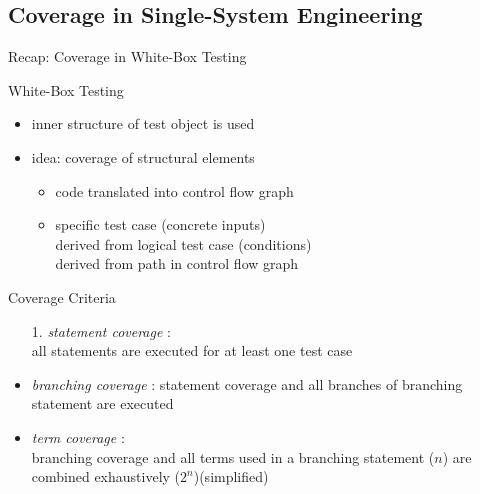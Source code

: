 \subsection{Coverage in Single-System Engineering}
\begin{frame}{Recap: Coverage in White-Box Testing{}  \mytitlesource{\ludewiglichter}}
	\begin{fancycolumns}
		\begin{definition}{White-Box Testing }
			\begin{itemize}
				\item inner structure of test object is used
				\item idea: coverage of structural elements
				\begin{itemize}
					\item code translated into control flow graph
					\item specific test case (concrete inputs)\\derived from logical test case (conditions)\\derived from path in control flow graph
				\end{itemize}	
			\end{itemize}
		\end{definition}
	\nextcolumn
		\begin{definition}{Coverage Criteria }
			\begin{itemize}
				\item[1.] \emph{statement coverage} :\\all statements are executed for at least one test case
				\item<3->[2.] \emph{branching coverage} : statement coverage and all branches of branching statement are executed %
				\item<4->[3.] \emph{term coverage} :\\branching coverage and all terms used in a branching statement ($n$) are combined exhaustively ($2^n$)\hfill(simplified)
			\end{itemize}
		\end{definition}
	\end{fancycolumns}
\end{frame}

